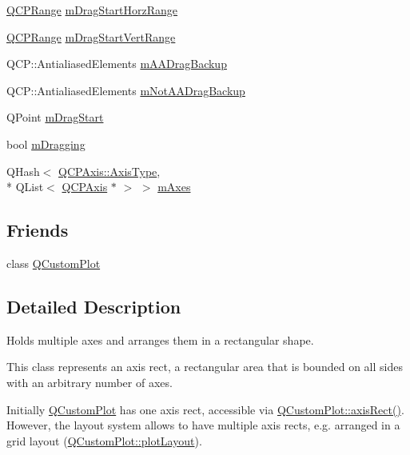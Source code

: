 \begin{DoxyCompactItemize}
\item 
\hyperlink{class_q_c_p_range}{Q\-C\-P\-Range} \hyperlink{class_q_c_p_axis_rect_a41936cf473ec638bec382f5a40cdb1f3}{m\-Drag\-Start\-Horz\-Range}
\item 
\hyperlink{class_q_c_p_range}{Q\-C\-P\-Range} \hyperlink{class_q_c_p_axis_rect_a1a5ae4c74b8bd46baf91bf4e4f4165f0}{m\-Drag\-Start\-Vert\-Range}
\item 
Q\-C\-P\-::\-Antialiased\-Elements \hyperlink{class_q_c_p_axis_rect_aa4a24f76360cfebe1bcf17a77fa7521b}{m\-A\-A\-Drag\-Backup}
\item 
Q\-C\-P\-::\-Antialiased\-Elements \hyperlink{class_q_c_p_axis_rect_a6fcb12e052e276d57efbb128be31d6f5}{m\-Not\-A\-A\-Drag\-Backup}
\item 
Q\-Point \hyperlink{class_q_c_p_axis_rect_a032896b28f83a58010d8d533b78c49df}{m\-Drag\-Start}
\item 
bool \hyperlink{class_q_c_p_axis_rect_ab49a6698194cf0e9e38a1d734c0888a8}{m\-Dragging}
\item 
Q\-Hash$<$ \hyperlink{class_q_c_p_axis_ae2bcc1728b382f10f064612b368bc18a}{Q\-C\-P\-Axis\-::\-Axis\-Type}, \\*
Q\-List$<$ \hyperlink{class_q_c_p_axis}{Q\-C\-P\-Axis} $\ast$ $>$ $>$ \hyperlink{class_q_c_p_axis_rect_afe7a24d2a2bea98fc552fa826350ba81}{m\-Axes}
\end{DoxyCompactItemize}
\subsection*{Friends}
\begin{DoxyCompactItemize}
\item 
class \hyperlink{class_q_c_p_axis_rect_a1cdf9df76adcfae45261690aa0ca2198}{Q\-Custom\-Plot}
\end{DoxyCompactItemize}


\subsection{Detailed Description}
Holds multiple axes and arranges them in a rectangular shape. 

This class represents an axis rect, a rectangular area that is bounded on all sides with an arbitrary number of axes.

Initially \hyperlink{class_q_custom_plot}{Q\-Custom\-Plot} has one axis rect, accessible via \hyperlink{class_q_custom_plot_a4a37a1add5fe63060ac518cf0a4c4050}{Q\-Custom\-Plot\-::axis\-Rect()}. However, the layout system allows to have multiple axis rects, e.\-g. arranged in a grid layout (\hyperlink{class_q_custom_plot_afd280d4d621ae64a106543a545c508d7}{Q\-Custom\-Plot\-::plot\-Layout}).

